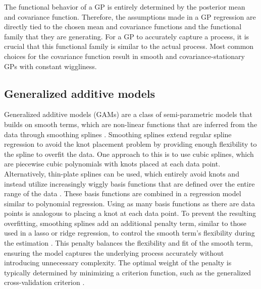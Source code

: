 \documentclass[man, floatsintext]{apa7}
\begin{document}
The functional behavior of a GP is entirely determined by the posterior mean
and covariance function. Therefore, the assumptions made in a GP regression
are directly tied to the chosen mean and covariance functions and the
functional family that they are generating. For a GP to accurately capture a
process, it is crucial that this functional family is similar to the actual
process. Most common choices for the covariance function result in smooth and
covariance-stationary GPs with constant wiggliness.

\subsection{Generalized additive models}

Generalized additive models (GAMs) are a class of semi-parametric models
that builds on smooth terms, which are
non-linear functions that are inferred from the data through smoothing splines
\parencite{wood_generalized_2006, wood_inference_2020,
  hastie_generalized_1999}. Smoothing splines extend regular spline regression
to avoid the knot placement problem by providing enough flexibility to the
spline to overfit the data. One approach to this is to use
cubic splines, which are piecewise cubic polynomials with knots placed at
each data point. Alternatively, thin-plate splines can be used, which entirely
avoid knots and instead utilize increasingly wiggly basis functions
that are defined over the entire range of the data \parencite{wood_thin_2003}.
These basis functions are combined in a regression model similar to polynomial
regression. Using as many basis functions as there are data points is analogous
to placing a knot at each data point.
To prevent the resulting overfitting, smoothing splines
add an additional penalty term, similar to those used in a
lasso or ridge regression, to control the smooth term's flexibility during
the estimation \parencite{gu_smoothing_2013, wahba_spline_1980}. This penalty
balances the
flexibility and fit of the smooth term, ensuring the model captures the
underlying process accurately without introducing unnecessary complexity. The
optimal weight of the penalty is typically determined by minimizing a criterion
function, such as the generalized cross-validation criterion
\parencite{wood_generalized_2006, golub_generalized_1997}.
\end{document}

